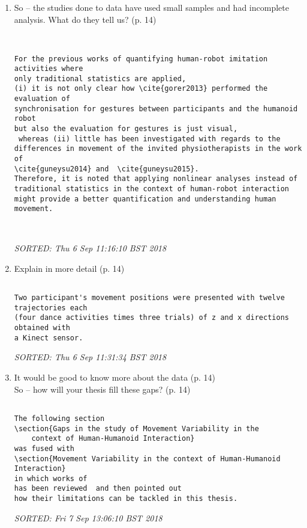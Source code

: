 \documentclass[10pt]{article}
\begin{document}
\begin{enumerate}[noitemsep,topsep=0pt]
\item So -- the studies done to data have used small samples 
	and had incomplete analysis.
	What do they tell us? (p. 14)


\begin{verbatim}


For the previous works of quantifying human-robot imitation activities where 
only traditional statistics are applied,
(i) it is not only clear how \cite{gorer2013} performed the evaluation of 
synchronisation for gestures between participants and the humanoid robot 
but also the evaluation for gestures is just visual,
 whereas (ii) little has been investigated with regards to the 
differences in movement of the invited physiotherapists in the work of
\cite{guneysu2014} and  \cite{guneysu2015}.
Therefore, it is noted that applying nonlinear analyses instead of 
traditional statistics in the context of human-robot interaction 
might provide a better quantification and understanding human movement.



\end{verbatim}
\textit{
SORTED: Thu  6 Sep 11:16:10 BST 2018
}
\\




\item Explain in more detail (p. 14)

\begin{verbatim}

Two participant's movement positions were presented with twelve trajectories each
(four dance activities times three trials) of z and x directions obtained with 
a Kinect sensor.

\end{verbatim}
\textit{
SORTED: Thu  6 Sep 11:31:34 BST 2018
}
\\



\item It would be good to know more about the data (p. 14) \\
	 So -- how will your thesis fill these gaps? (p. 14)

\begin{verbatim}

The following section 
\section{Gaps in the study of Movement Variability in the 
	context of Human-Humanoid Interaction}
was fused with 
\section{Movement Variability in the context of Human-Humanoid Interaction}
in which works of 
has been reviewed  and then pointed out
how their limitations can be tackled in this thesis.

\end{verbatim}
\textit{
SORTED: Fri  7 Sep 13:06:10 BST 2018
}




\end{enumerate}
\end{document}
